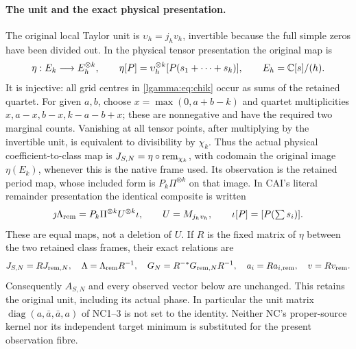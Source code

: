 \paragraph{The unit and the exact physical presentation.}
The original local Taylor unit is $\upsilon_h=j_hv_h$, invertible
because the full simple zeros have been divided out.  In the physical
tensor presentation the original map is
\[
 \eta:E_k\longrightarrow E_h^{\otimes k},\qquad
 \eta[P]=\upsilon_h^{\otimes k}[P(s_1+\cdots+s_k)],
 \qquad E_h=\mathbb C[s]/(h).
\]
It is injective: all grid centres in \eqref{lgamma:eq:chik} occur as sums of
the retained quartet.  For given $a,b$, choose $x=\max(0,a+b-k)$
and quartet multiplicities $x,a-x,b-x,k-a-b+x$; these are nonnegative
and have the required two marginal counts.  Vanishing at all tensor
points, after multiplying
by the invertible unit, is equivalent to divisibility by $\chi_k$.
Thus the actual physical coefficient-to-class map is
$J_{S,N}=\eta\circ\operatorname{rem}_{\chi_k}$, with codomain the original image
$\eta(E_k)$, whenever this is the native frame used.  Its observation
is the retained period map, whose included form is
$P_k\Pi^{\otimes k}$ on that image.  In CAI's literal remainder
presentation the identical composite is written
\[
 \jmath\Lambda_{\rm rem}
 =P_k\Pi^{\otimes k}U^{\otimes k}\iota,
 \qquad U=M_{j_hv_h},\qquad \iota[P]=[P(\textstyle\sum s_i)].
\]
These are equal maps, not a deletion of $U$.  If $R$ is the fixed
matrix of $\eta$ between the two retained class frames, their exact
relations are
\begin{equation}\label{lgamma:eq:unitframe}
 J_{S,N}=R J_{{\rm rem},N},\quad
 \Lambda=\Lambda_{\rm rem}R^{-1},\quad
 G_N=R^{-*}G_{{\rm rem},N}R^{-1},\quad
 a_i=R a_{i,\rm rem},\quad v=Rv_{\rm rem}.
\end{equation}
Consequently $A_{S,N}$ and every observed vector below are unchanged.
This retains the original unit, including its actual phase.  In
particular the unit matrix $\operatorname{diag}(a,\bar a,\bar a,a)$
of NC1--3 \cite{lgamma:NC} is not set to the identity.  Neither NC's
proper-source kernel nor its independent target minimum is substituted
for the present observation fibre.

